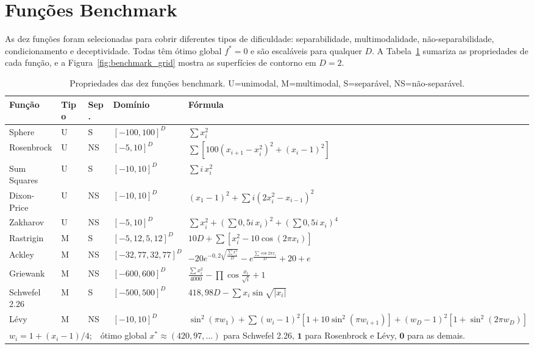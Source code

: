 \documentclass[runningheads]{llncs}
\begin{document}
\section{Fun\c{c}\~{o}es Benchmark}
\label{sec:benchmark}

As dez funções foram selecionadas para cobrir diferentes tipos de
dificuldade: separabilidade, multimodalidade, não-separabilidade,
condicionamento e deceptividade. Todas têm ótimo global $f^*=0$ e
são escaláveis para qualquer $D$. A Tabela~\ref{tab:funcoes} sumariza
as propriedades de cada função, e a Figura~\ref{fig:benchmark_grid}
mostra as superfícies de contorno em $D=2$.

\begin{table}[H]
\caption{Propriedades das dez funções benchmark.
U=unimodal, M=multimodal, S=separável, NS=não-separável.}
\label{tab:funcoes}
\centering
\scriptsize
\setlength{\tabcolsep}{3pt}
\begin{tabular}{llllp{5.2cm}}
\toprule
\textbf{Função} & \textbf{Tipo} & \textbf{Sep.} & \textbf{Domínio} & \textbf{Fórmula} \\
\midrule
Sphere       & U & S  & $[-100,100]^D$ & $\sum x_i^2$ \\
Rosenbrock   & U & NS & $[-5,10]^D$    & $\sum[100(x_{i+1}\!-\!x_i^2)^2\!+(x_i\!-\!1)^2]$ \\
Sum Squares  & U & S  & $[-10,10]^D$   & $\sum i\,x_i^2$ \\
Dixon-Price  & U & NS & $[-10,10]^D$   & $(x_1\!-\!1)^2\!+\!\sum i(2x_i^2\!-\!x_{i-1})^2$ \\
Zakharov     & U & NS & $[-5,10]^D$    & $\sum x_i^2 + (\sum 0{,}5i\,x_i)^2 + (\sum 0{,}5i\,x_i)^4$ \\
Rastrigin    & M & S  & $[-5{,}12,5{,}12]^D$ & $10D+\sum[x_i^2-10\cos(2\pi x_i)]$ \\
Ackley       & M & NS & $[-32{,}77,32{,}77]^D$ & $-20e^{-0{,}2\sqrt{\frac{\sum x_i^2}{D}}}-e^{\frac{\sum\cos 2\pi x_i}{D}}+20+e$ \\
Griewank     & M & NS & $[-600,600]^D$ & $\frac{\sum x_i^2}{4000}-\prod\cos\frac{x_i}{\sqrt{i}}+1$ \\
Schwefel 2.26& M & S  & $[-500,500]^D$ & $418{,}98D-\sum x_i\sin\sqrt{|x_i|}$ \\
Lévy         & M & NS & $[-10,10]^D$   & $\sin^2(\pi w_1)\!+\!\sum(w_i\!-\!1)^2[1\!+\!10\sin^2(\pi w_{i+1})]\!+\!(w_D\!-\!1)^2[1\!+\!\sin^2(2\pi w_D)]$ \\
\bottomrule
\multicolumn{5}{l}{\scriptsize $w_i=1+(x_i-1)/4$;\ \ 
  ótimo global $x^*\approx(420{,}97,\ldots)$ para Schwefel 2.26,
  $\mathbf{1}$ para Rosenbrock e Lévy, $\mathbf{0}$ para as demais.}
\end{tabular}
\end{table}
\end{document}
